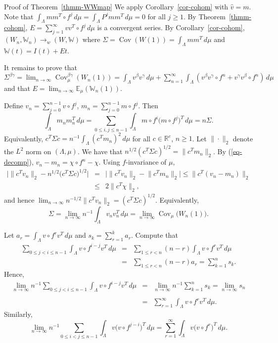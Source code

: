 \documentclass[aop,MSNbibl,seceqn,dvips]{arximspdf}
\newcommand{\eqref}[1]{(\ref{#1})}
\newcommand{\R}{\mathbb{R}}
\newcommand{\E}{\mathbb{E}}
\newcommand{\BBW}{\mathbb{W}}
\newcommand{\Cov}{\operatorname{Cov}}
\begin{document}
\begin{pf*}{Proof of Theorem~\ref{thmm-WWmap}}
We apply Corollary~\ref{cor-cohom} with $\hat v=m$.
Note that $\int_\Lambda m m^T\circ f^j \,d\mu=
\int_\Lambda P^jm m^T \,d\mu=0$ for all $j\ge1$.
By Theorem~\ref{thmm-cohom}, $E=\sum_{j=1}^\infty v v^T\circ f^j \,d\mu$
is a convergent series.
By Corollary~\ref{cor-cohom}, $(W_n,\BBW_n)\to_w(W,\BBW)$ where
$\Sigma=\Cov(W(1))=\int_\Lambda m m^T \,d\mu$ and $\BBW(t)=I(t)+Et$.

It remains to prove that $\Sigma^{\beta\gamma}=\lim_{n\to\infty
}\Cov
^{\beta\gamma}_\mu(W_n(1))=
\int_\Lambda v^\beta v^\gamma \,d\mu+
\sum_{n=1}^\infty\int_\Lambda(v^\beta v^\gamma\circ f^n+
v^\gamma v^\beta\circ f^n) \,d\mu$ and
that $E=\lim_{n\to\infty} \E_\mu(\BBW_n(1))$.

Define $v_n=\sum_{j=0}^{n-1}v\circ f^j$,
$m_n=\sum_{j=0}^{n-1}m\circ f^j$.
Then
%
\[
\int_\Lambda m_nm_n^T \,d
\mu= \sum_{0\le i,j\le n-1} \int_\Lambda m\circ
f^i\bigl(m\circ f^j\bigr)^T \,d\mu=n\Sigma.
\]
%
Equivalently, $c^T\Sigma c=n^{-1}\int_\Lambda(c^Tm_n)^2 \,d\mu$
for all $c\in\R^e$, $n\ge1$.
Let $\|\cdot \|_2$ denote the $L^2$ norm on $(\Lambda,\mu)$. We have that
$n^{{1}/2}(c^T\Sigma c)^{{1}/2}= \|c^Tm_n\|_2$. By \eqref{eq-decomp},
$v_n-m_n=\chi\circ f^n-\chi$. Using $f$-invariance of
$\mu$,
%
\begin{eqnarray*}
\bigl|\bigl\|c^Tv_n\bigr\|_2-n^{{1}/2}
\bigl(c^T\Sigma c\bigr)^{{1}/2} \bigr|& =&\bigl |\bigl\|c^Tv_n
\bigr\|_2-\bigl\|c^Tm_n\bigr\|_2 \bigr|\le
\bigl\|c^T(v_n-m_n)\bigr\|_2\\
&\le& 2
\bigl\|c^T\chi\bigr\|_2,
\end{eqnarray*}
%
and hence $\lim_{n\to\infty}n^{-{1}/2}\|c^Tv_n\|_2=(c^T\Sigma
c)^{{1}/2}$.
Equivalently,
%
\begin{equation}
\label{eq-Sigma1} \Sigma=\lim_{n\to\infty}n^{-1}\int
_\Lambda v_n v_n^T \,d\mu=
\lim_{n\to
\infty}\Cov_\mu\bigl(W_n(1)\bigr).
\end{equation}

Let $a_r=\int_\Lambda v\circ f^r v^T \,d\mu$ and $s_k=\sum_{r=1}^k a_r$.
Compute that
%
\begin{eqnarray*}
\sum_{0\le j<i\le n-1}\int_\Lambda v\circ
f^{i-j} v^T \,d\mu & =& \sum_{1\le r<n}(n-r)
\int_\Lambda v\circ f^r v^T \,d\mu
\\
& = &\sum_{1\le r<n}(n-r)a_r =\sum
_{k=1}^n s_k.
\end{eqnarray*}
%
Hence,
%
\begin{eqnarray}
\label{eq-Sigma2}
\lim_{n\to\infty}n^{-1}\sum
_{0\le j<i\le n-1}\int_\Lambda v\circ
f^{i-j} v^T \,d\mu & =&\lim_{n\to\infty}n^{-1}
\sum_{k=1}^n s_k =\lim
_{n\to\infty}s_n
\nonumber
\\[-8pt]
\\[-8pt]
\nonumber
& =&\sum_{r=1}^\infty\int
_\Lambda v\circ f^r v^T \,d\mu.
\end{eqnarray}
%
Similarly,
%
\begin{equation}
\label{eq-Sigma3} \lim_{n\to\infty}n^{-1}\sum
_{0\le i<j\le n-1}\int_\Lambda v \bigl(v\circ
f^{j-i}\bigr)^T \,d\mu = \sum_{r=1}^\infty
\int_\Lambda v \bigl(v\circ f^r
\bigr)^T \,d\mu.
\end{equation}


\end{pf*}
\end{document}
